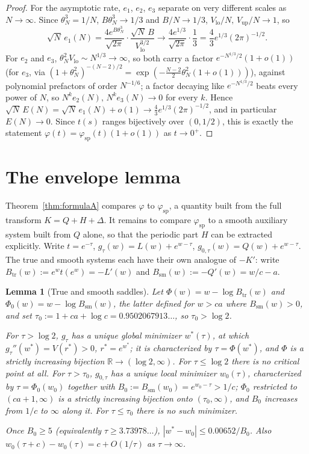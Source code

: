 \documentclass[11pt]{article}
\newtheorem{lemma}[theorem]{Lemma}
\theoremstyle{definition}
\theoremstyle{remark}
\newcommand{\R}{\mathbb{R}}
\begin{document}
\begin{proof}
For the asymptotic rate, $e_1$, $e_2$, $e_3$ separate on very different scales as $N\to\infty$.
Since $\theta_N^3=1/N$, $B\theta_N^3\to1/3$ and $B/N\to1/3$, $V_{\mathrm{lo}}/N,\,V_{\mathrm{up}}/N
\to1$, so
\[
\sqrt N\,e_1(N) = \frac{4e^{B\theta_N^3}}{\sqrt{2\pi}}\cdot\frac{\sqrt N\,B}{V_{\mathrm{lo}}^{3/2}}
\longrightarrow \frac{4e^{1/3}}{\sqrt{2\pi}}\cdot\frac13 = \frac43e^{1/3}(2\pi)^{-1/2}.
\]
For $e_2$ and $e_3$, $\theta_N^2V_{\mathrm{lo}} \sim N^{1/3}\to\infty$, so both carry a factor
$e^{-N^{1/3}/2}(1+o(1))$ (for $e_3$, via $(1+\theta_N^2)^{-(N-2)/2} =
\exp(-\tfrac{N-2}2\theta_N^2(1+o(1)))$), against polynomial prefactors of order $N^{-1/6}$; a
factor decaying like $e^{-N^{1/3}/2}$ beats every power of $N$, so $N^k e_2(N),\,N^k e_3(N)\to0$
for every $k$. Hence $\sqrt N\,E(N) = \sqrt N\,e_1(N) + o(1) \to \tfrac43e^{1/3}(2\pi)^{-1/2}$, and
in particular $E(N)\to0$. Since $t(s)$ ranges bijectively over $(0,1/2)$, this is exactly the
statement $\varphi(t)=\varphi_{\mathrm{sp}}(t)(1+o(1))$ as $t\to0^+$.
\end{proof}


\section{The envelope lemma}
\label{sec:envelope}

Theorem~\ref{thm:formulaA} compares $\varphi$ to $\varphi_{\mathrm{sp}}$, a quantity built from the
full transform $K=Q+H+\Delta$. It remains to compare $\varphi_{\mathrm{sp}}$ to a smooth auxiliary
system built from $Q$ alone, so that the periodic part $H$ can be extracted explicitly. Write
$t=e^{-\tau}$, $g_\tau(w) = L(w)+e^{w-\tau}$, $g_{0,\tau}(w) = Q(w)+e^{w-\tau}$. The true and smooth
systems each have their own analogue of $-K'$: write $B_{\mathrm{tr}}(w) := e^wt(e^w) = -L'(w)$ and
$B_{\mathrm{sm}}(w) := -Q'(w) = w/c-a$.

\begin{lemma}[True and smooth saddles]
\label{lem:saddles}
Let $\Phi(w) = w-\log B_{\mathrm{tr}}(w)$ and $\Phi_0(w) = w-\log B_{\mathrm{sm}}(w)$, the latter
defined for $w>ca$ where $B_{\mathrm{sm}}(w)>0$, and set
$\tau_0 := 1+ca+\log c = 0.9502067913\ldots$, so $\tau_0 > \log 2$.

For $\tau>\log 2$, $g_\tau$ has a unique global minimizer $w^*(\tau)$, at which $g_\tau''(w^*) =
V(r^*)>0$, $r^*=e^{w^*}$; it is characterized by $\tau = \Phi(w^*)$, and $\Phi$ is a strictly
increasing bijection $\R\to(\log 2,\infty)$. For $\tau\le\log 2$ there is no critical point at
all. For $\tau>\tau_0$, $g_{0,\tau}$ has a unique local minimizer $w_0(\tau)$, characterized by
$\tau=\Phi_0(w_0)$ together with $B_0 := B_{\mathrm{sm}}(w_0) = e^{w_0-\tau} > 1/c$; $\Phi_0$
restricted to $(ca+1,\infty)$ is a strictly increasing bijection onto $(\tau_0,\infty)$, and $B_0$
increases from $1/c$ to $\infty$ along it. For $\tau\le\tau_0$ there is no such minimizer.

Once $B_0\ge5$ (equivalently $\tau\ge3.73978\ldots$), $|w^*-w_0| \le 0.00652/B_0$. Also
$w_0(\tau+c)-w_0(\tau) = c+O(1/\tau)$ as $\tau\to\infty$.
\end{lemma}
\end{document}
